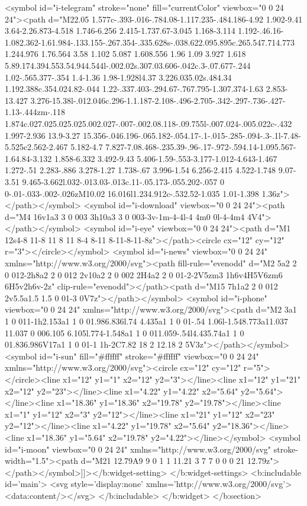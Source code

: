 {{{{<symbol id="i-telegram" stroke="none" fill="currentColor" viewbox="0 0 24 24"><path d="M22.05 1.577c-.393-.016-.784.08-1.117.235-.484.186-4.92 1.902-9.41 3.64-2.26.873-4.518 1.746-6.256 2.415-1.737.67-3.045 1.168-3.114 1.192-.46.16-1.082.362-1.61.984-.133.155-.267.354-.335.628s-.038.622.095.895c.265.547.714.773 1.244.976 1.76.564 3.58 1.102 5.087 1.608.556 1.96 1.09 3.927 1.618 5.89.174.394.553.54.944.544l-.002.02s.307.03.606-.042c.3-.07.677-.244 1.02-.565.377-.354 1.4-1.36 1.98-1.928l4.37 3.226.035.02s.484.34 1.192.388c.354.024.82-.044 1.22-.337.403-.294.67-.767.795-1.307.374-1.63 2.853-13.427 3.276-15.38l-.012.046c.296-1.1.187-2.108-.496-2.705-.342-.297-.736-.427-1.13-.444zm-.118 1.874c.027.025.025.025.002.027-.007-.002.08.118-.09.755l-.007.024-.005.022c-.432 1.997-2.936 13.9-3.27 15.356-.046.196-.065.182-.054.17-.1-.015-.285-.094-.3-.1l-7.48-5.525c2.562-2.467 5.182-4.7 7.827-7.08.468-.235.39-.96-.17-.972-.594.14-1.095.567-1.64.84-3.132 1.858-6.332 3.492-9.43 5.406-1.59-.553-3.177-1.012-4.643-1.467 1.272-.51 2.283-.886 3.278-1.27 1.738-.67 3.996-1.54 6.256-2.415 4.522-1.748 9.07-3.51 9.465-3.662l.032-.013.03-.013c.11-.05.173-.055.202-.057 0 0-.01-.033-.002-.026zM10.02 16.016l1.234.912c-.532.52-1.035 1.01-1.398 1.36z"></path></symbol>
<symbol id="i-download" viewbox="0 0 24 24"><path d="M4 16v1a3 3 0 003 3h10a3 3 0 003-3v-1m-4-4l-4 4m0 0l-4-4m4 4V4"></path></symbol>
<symbol id="i-eye" viewbox="0 0 24 24"><path d="M1 12s4-8 11-8 11 8 11 8-4 8-11 8-11-8-11-8z"></path><circle cx="12" cy="12" r="3"></circle></symbol>
<symbol id="i-news" viewbox="0 0 24 24" xmlns="http://www.w3.org/2000/svg"><path fill-rule="evenodd" d="M2 5a2 2 0 012-2h8a2 2 0 012 2v10a2 2 0 002 2H4a2 2 0 01-2-2V5zm3 1h6v4H5V6zm6 6H5v2h6v-2z" clip-rule="evenodd"></path><path d="M15 7h1a2 2 0 012 2v5.5a1.5 1.5 0 01-3 0V7z"></path></symbol>
<symbol id="i-phone" viewbox="0 0 24 24" xmlns="http://www.w3.org/2000/svg"><path d="M2 3a1 1 0 011-1h2.153a1 1 0 01.986.836l.74 4.435a1 1 0 01-.54 1.06l-1.548.773a11.037 11.037 0 006.105 6.105l.774-1.548a1 1 0 011.059-.54l4.435.74a1 1 0 01.836.986V17a1 1 0 01-1 1h-2C7.82 18 2 12.18 2 5V3z"></path></symbol>
<symbol id="i-sun" fill="#ffffff" stroke="#ffffff" viewbox="0 0 24 24" xmlns="http://www.w3.org/2000/svg"><circle cx="12" cy="12" r="5"></circle><line x1="12" y1="1" x2="12" y2="3"></line><line x1="12" y1="21" x2="12" y2="23"></line><line x1="4.22" y1="4.22" x2="5.64" y2="5.64"></line><line x1="18.36" y1="18.36" x2="19.78" y2="19.78"></line><line x1="1" y1="12" x2="3" y2="12"></line><line x1="21" y1="12" x2="23" y2="12"></line><line x1="4.22" y1="19.78" x2="5.64" y2="18.36"></line><line x1="18.36" y1="5.64" x2="19.78" y2="4.22"></line></symbol>
<symbol id="i-moon" viewbox="0 0 24 24" xmlns="http://www.w3.org/2000/svg" stroke-width="1.5"><path d="M21 12.79A9 9 0 1 1 11.21 3 7 7 0 0 0 21 12.79z"></path></symbol>]]></b:widget-setting>
    </b:widget-settings>
    <b:includable id='main'>
      <svg style='display:none' xmlns='http://www.w3.org/2000/svg'><data:content/></svg>
    </b:includable>
  </b:widget>
</b:section>

}}}}
